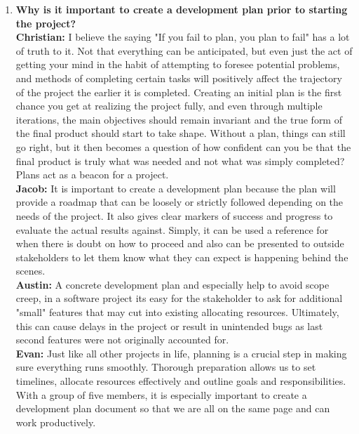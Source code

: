 \documentclass{article}
\begin{document}
\begin{enumerate}
    \item \textbf{Why is it important to create a development plan prior to starting the
    project?}\\
  
  \textbf{Christian:} I believe the saying "If you fail to plan, you plan to fail" has a lot of truth to it. Not that everything can be anticipated, but even just the act of getting your mind in the habit of attempting to foresee potential problems, and methods of completing certain tasks will positively affect the trajectory of the project the earlier it is completed. Creating an initial plan is the first chance you get at realizing the project fully, and even through multiple iterations, the main objectives should remain invariant and the true form of the final product should start to take shape. Without a plan, things can still go right, but it then becomes a question of how confident can you be that the final product is truly what was needed and not what was simply completed? Plans act as a beacon for a project.\\

  \textbf{Jacob:} It is important to create a development plan because the plan will provide a roadmap that can be loosely or strictly followed depending on the needs of the project. It also gives clear markers of success and progress to evaluate the actual results against. Simply, it can be used a reference for when there is doubt on how to proceed and also can be presented to outside stakeholders to let them know what they can expect is happening behind the scenes.\\

  \textbf{Austin:} A concrete development plan and especially help to avoid scope creep, in a software project its easy for the stakeholder to ask for additional "small" features that may cut into existing allocating resources. Ultimately, this can cause delays in the project or result in unintended bugs as last second features were not originally accounted for. \\

  \textbf{Evan:} Just like all other projects in life, planning is a crucial step in making sure everything runs smoothly. Thorough preparation allows us to set timelines, allocate resources effectively and outline goals and responsibilities. With a group of five members, it is especially important to create a development plan document so that we are all on the same page and can work productively. \\


\end{enumerate}
\end{document}

